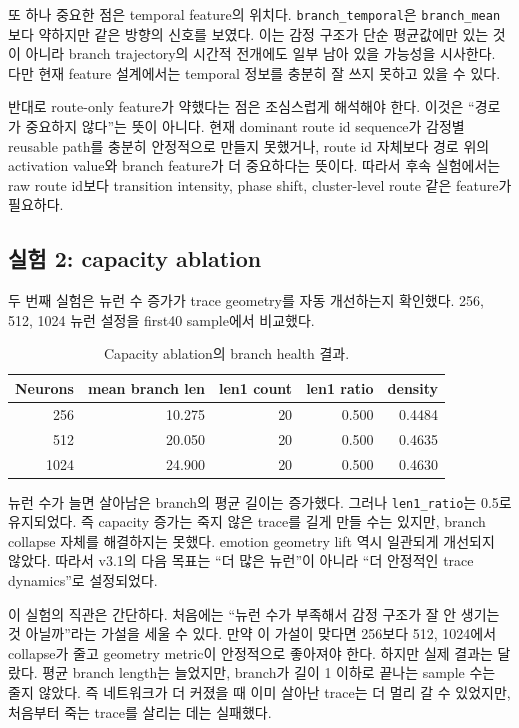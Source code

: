 \documentclass[11pt,a4paper]{article}
\begin{document}
또 하나 중요한 점은 temporal feature의 위치다. \texttt{branch\_temporal}은 \texttt{branch\_mean}보다 약하지만 같은 방향의 신호를 보였다. 이는 감정 구조가 단순 평균값에만 있는 것이 아니라 branch trajectory의 시간적 전개에도 일부 남아 있을 가능성을 시사한다. 다만 현재 feature 설계에서는 temporal 정보를 충분히 잘 쓰지 못하고 있을 수 있다.

반대로 route-only feature가 약했다는 점은 조심스럽게 해석해야 한다. 이것은 ``경로가 중요하지 않다''는 뜻이 아니다. 현재 dominant route id sequence가 감정별 reusable path를 충분히 안정적으로 만들지 못했거나, route id 자체보다 경로 위의 activation value와 branch feature가 더 중요하다는 뜻이다. 따라서 후속 실험에서는 raw route id보다 transition intensity, phase shift, cluster-level route 같은 feature가 필요하다.

\subsection{실험 2: capacity ablation}

두 번째 실험은 뉴런 수 증가가 trace geometry를 자동 개선하는지 확인했다. 256, 512, 1024 뉴런 설정을 first40 sample에서 비교했다.

\begin{table}[h]
\centering
\begin{tabular}{rrrrr}
\toprule
Neurons & mean branch len & len1 count & len1 ratio & density \\
\midrule
256 & 10.275 & 20 & 0.500 & 0.4484 \\
512 & 20.050 & 20 & 0.500 & 0.4635 \\
1024 & 24.900 & 20 & 0.500 & 0.4630 \\
\bottomrule
\end{tabular}
\caption{Capacity ablation의 branch health 결과.}
\label{tab:capacity}
\end{table}

뉴런 수가 늘면 살아남은 branch의 평균 길이는 증가했다. 그러나 \texttt{len1\_ratio}는 0.5로 유지되었다. 즉 capacity 증가는 죽지 않은 trace를 길게 만들 수는 있지만, branch collapse 자체를 해결하지는 못했다. emotion geometry lift 역시 일관되게 개선되지 않았다. 따라서 v3.1의 다음 목표는 ``더 많은 뉴런''이 아니라 ``더 안정적인 trace dynamics''로 설정되었다.

이 실험의 직관은 간단하다. 처음에는 ``뉴런 수가 부족해서 감정 구조가 잘 안 생기는 것 아닐까''라는 가설을 세울 수 있다. 만약 이 가설이 맞다면 256보다 512, 1024에서 collapse가 줄고 geometry metric이 안정적으로 좋아져야 한다. 하지만 실제 결과는 달랐다. 평균 branch length는 늘었지만, branch가 길이 1 이하로 끝나는 sample 수는 줄지 않았다. 즉 네트워크가 더 커졌을 때 이미 살아난 trace는 더 멀리 갈 수 있었지만, 처음부터 죽는 trace를 살리는 데는 실패했다.
\end{document}
